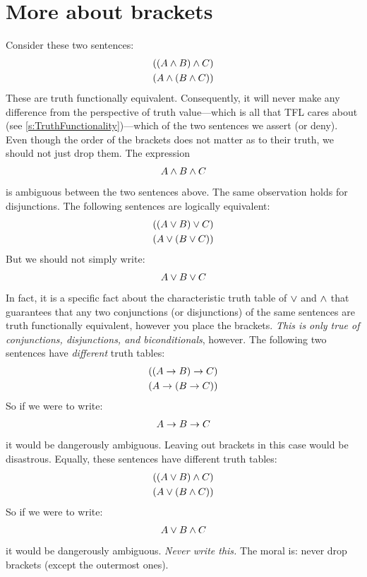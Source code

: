 \section{More about brackets}\label{s:MoreBracketingConventions}
Consider these two sentences:
	\begin{align*}
		((A \wedge B) \wedge C)\\
		(A \wedge (B \wedge C))
	\end{align*}
These are truth functionally equivalent. Consequently, it will never make any difference from the perspective of truth value---which is all that TFL cares about (see \cref{s:TruthFunctionality})---which of the two sentences we assert (or deny). Even though the order of the brackets does not matter as to their truth, we should not just drop them. The expression
	\begin{align*}
		A \wedge B \wedge C
	\end{align*}
is ambiguous between the two sentences above.  The same observation holds for disjunctions. The following sentences are logically equivalent:
	\begin{align*}
		((A \vee B) \vee C)\\
		(A \vee (B \vee C))
	\end{align*}
But we should not simply write:
	\begin{align*}
		A \vee B \vee C
	\end{align*}
In fact, it is a specific fact about the characteristic truth table of
$\vee$ and $\wedge$ that guarantees that any two conjunctions (or
disjunctions) of the same sentences are truth functionally equivalent,
however you place the brackets. \emph{This is only true of
conjunctions, disjunctions, and biconditionals}, however. The following two sentences
have \emph{different} truth tables:
	\begin{align*}
		((A \rightarrow B) \rightarrow C)\\
		(A \rightarrow (B \rightarrow C))
	\end{align*}
So if we were to write:
	\begin{align*}
		A \rightarrow B \rightarrow C
	\end{align*}
it would be dangerously ambiguous. Leaving out brackets in this case would be disastrous. Equally, these sentences have different truth tables:
	\begin{align*}
		((A \vee B) \wedge C)\\
		(A \vee (B \wedge C))
	\end{align*}
So if we were to write:
	\begin{align*}
		A \vee B \wedge C
	\end{align*}
it would be dangerously ambiguous. \emph{Never write this.} The moral is: never drop brackets (except the outermost ones).

